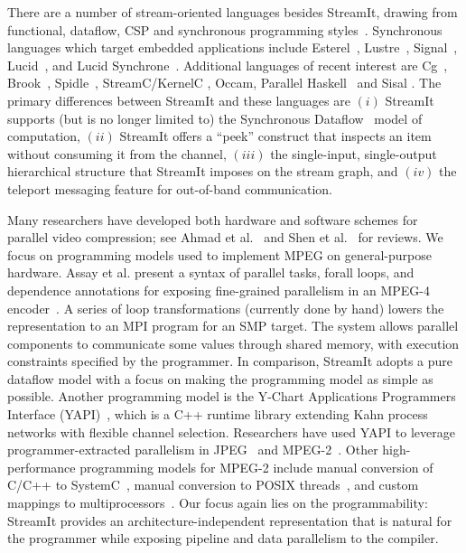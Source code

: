 There are a number of stream-oriented languages besides StreamIt,
drawing from functional, dataflow, CSP and synchronous programming
styles~\cite{survey97}.  Synchronous languages which target embedded
applications include Esterel~\cite{Esterel}, Lustre~\cite{Lustre},
Signal~\cite{Signal}, Lucid~\cite{Lucid77}, and Lucid
Synchrone~\cite{Lucid-Synchrone}.  Additional languages of recent
interest are Cg~\cite{cg03}, Brook~\cite{brook04},
Spidle~\cite{spidle03}, StreamC/KernelC \cite{imagine03ieee},
Occam\cite{Occam}, Parallel Haskell~\cite{ph} and Sisal \cite{sisal}.
The primary differences between StreamIt and these languages are $(i)$
StreamIt supports (but is no longer limited to) the Synchronous
Dataflow~\cite{lee87static} model of computation, $(ii)$ StreamIt
offers a ``peek'' construct that inspects an item without consuming it
from the channel, $(iii)$ the single-input, single-output hierarchical
structure that StreamIt imposes on the stream graph, and $(iv)$ the
teleport messaging feature for out-of-band communication.

Many researchers have developed both hardware and software schemes for
parallel video compression; see Ahmad et al.~\cite{ahmad01compression}
and Shen et al.~\cite{shen94overview} for reviews.  We focus on
programming models used to implement MPEG on general-purpose hardware.
Assay et al. present a syntax of parallel tasks, forall loops, and
dependence annotations for exposing fine-grained parallelism in an
MPEG-4 encoder~\cite{assayad05mpeg4b}.  A series of loop
transformations (currently done by hand) lowers the representation to
an MPI program for an SMP target.  The system allows parallel
components to communicate some values through shared memory, with
execution constraints specified by the programmer.  In comparison,
StreamIt adopts a pure dataflow model with a focus on making the
programming model as simple as possible.  Another programming model is
the Y-Chart Applications Programmers Interface
(YAPI)~\cite{kock00yapi}, which is a C++ runtime library extending
Kahn process networks with flexible channel selection.  Researchers
have used YAPI to leverage programmer-extracted parallelism in
JPEG~\cite{kock02jpeg} and MPEG-2~\cite{dwivedi01exploring}.  Other
high-performance programming models for MPEG-2 include manual
conversion of C/C++ to SystemC~\cite{pazos04soc}, manual conversion to
POSIX threads~\cite{li05alpbench}, and custom mappings to
multiprocessors~\cite{iwata98coarse, ahmad01multiproc}.  Our focus
again lies on the programmability: StreamIt provides an
architecture-independent representation that is natural for the
programmer while exposing pipeline and data parallelism to the
compiler.

